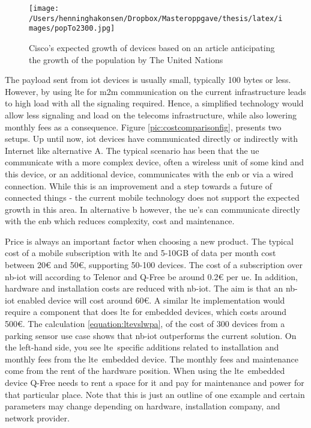 \documentclass[USenglish]{ifimaster}  %
\begin{document}
\begin{figure}[ht]
  \centering\texttt{[image: /Users/henninghakonsen/Dropbox/Masteroppgave/thesis/latex/images/popTo2300.jpg]}
  \caption[\acrshort{iot} Growth]{Cisco's expected growth of devices based on an article anticipating the growth of the population by The United Nations \cite{online:pop2300}\cite{online:IoT2020}}
  \label{pic:IoT2020}
\end{figure}

The payload sent from \acrshort{iot} devices is usually small, typically 100 bytes or less. However, by using \acrfull{lte} for \acrfull{m2m} communication on the current infrastructure leads to high load with all the signaling required. Hence, a simplified technology would allow less signaling and load on the telecoms infrastructure, while also lowering monthly fees as a consequence. Figure \vref{pic:costcomparisonfig}, presents two setups. Up until now, \acrshort{iot} devices have communicated directly or indirectly with Internet like alternative A. The typical scenario has been that the \acrfull{ue} communicate with a more complex device, often a wireless unit of some kind and this device, or an additional device, communicates with the \acrfull{enb} or via a wired connection. While this is an improvement and a step towards a future of connected things - the current mobile technology does not support the expected growth in this area. In alternative b however, the \acrshort{ue}'s can communicate directly with the \acrshort{enb} which reduces complexity, cost and maintenance.

Price is always an important factor when choosing a new product. The typical cost of a mobile subscription with \acrshort{lte} and 5-10GB of data per month cost between 20€ and 50€, supporting 50-100 devices. The cost of a subscription over \acrshort{nb-iot} will according to Telenor and Q-Free be around 0.2€ per \acrshort{ue}. In addition, hardware and installation costs are reduced with \acrshort{nb-iot}. The aim is that an \acrshort{nb-iot} enabled device will cost around 60€. A similar \acrshort{lte} implementation would require a component that does \acrshort{lte} for embedded devices, which costs around 500€. The calculation \vref{equation:ltevslwpa}, of the cost of 300 devices from a parking sensor use case shows that \acrshort{nb-iot} outperforms the current solution. On the left-hand side, you see \acrshort{lte} specific additions related to installation and monthly fees from the \acrshort{lte} embedded device. The monthly fees and maintenance come from the rent of the hardware position. When using the \acrshort{lte} embedded device Q-Free needs to rent a space for it and pay for maintenance and power for that particular place. Note that this is just an outline of one example and certain parameters may change depending on hardware, installation company, and network provider.
\end{document}
